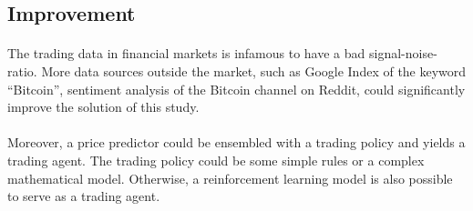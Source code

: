 \documentclass[12pt, letterpaper]{article}
\begin{document}

\subsection{Improvement}

\paragraph{}
The trading data in financial markets is infamous to have a bad signal-noise-ratio. More data sources outside the market, such as Google Index of the keyword ``Bitcoin'', sentiment analysis of the Bitcoin channel on Reddit, could significantly improve the solution of this study.

\paragraph{}
Moreover, a price predictor could be ensembled with a trading policy and yields a trading agent. The trading policy could be some simple rules or a complex mathematical model. Otherwise, a reinforcement learning model is also possible to serve as a trading agent.


\end{document}
